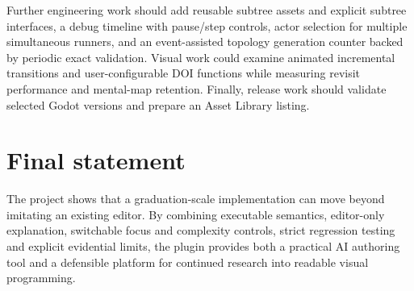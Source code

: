 Further engineering work should add reusable subtree assets and explicit subtree interfaces, a debug timeline with pause/step controls, actor selection for multiple simultaneous runners, and an event-assisted topology generation counter backed by periodic exact validation. Visual work could examine animated incremental transitions and user-configurable \ac{DOI} functions while measuring revisit performance and mental-map retention. Finally, release work should validate selected Godot versions and prepare an Asset Library listing.

\section{Final statement}

The project shows that a graduation-scale implementation can move beyond imitating an existing editor. By combining executable semantics, editor-only explanation, switchable focus and complexity controls, strict regression testing and explicit evidential limits, the plugin provides both a practical AI authoring tool and a defensible platform for continued research into readable visual programming.
